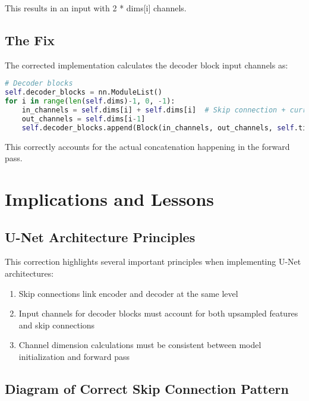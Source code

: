 \documentclass{article}
\begin{document}
This results in an input with 2 * dims[i] channels.

\subsection{The Fix}

The corrected implementation calculates the decoder block input channels as:

\begin{lstlisting}[language=Python, frame=single]
# Decoder blocks
self.decoder_blocks = nn.ModuleList()
for i in range(len(self.dims)-1, 0, -1):
    in_channels = self.dims[i] + self.dims[i]  # Skip connection + current level features
    out_channels = self.dims[i-1]
    self.decoder_blocks.append(Block(in_channels, out_channels, self.time_emb_dim))
\end{lstlisting}

This correctly accounts for the actual concatenation happening in the forward pass.

\section{Implications and Lessons}

\subsection{U-Net Architecture Principles}

This correction highlights several important principles when implementing U-Net architectures:

\begin{enumerate}
  \item Skip connections link encoder and decoder at the same level
  \item Input channels for decoder blocks must account for both upsampled features and skip connections
  \item Channel dimension calculations must be consistent between model initialization and forward pass
\end{enumerate}

\subsection{Diagram of Correct Skip Connection Pattern}
\end{document}
